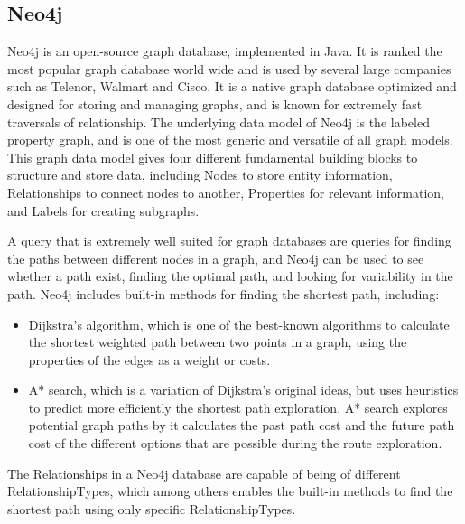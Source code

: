 \subsection{Neo4j}
\label{subsubsec:neo4j}
Neo4j\citep{website:neo4j} is an open-source graph database, implemented in Java. It is ranked the most popular graph database world wide \citep{website:graphdbranking} and is used by several large companies such as Telenor\citep{website:telenor}, Walmart\citep{website:walmart} and Cisco\citep{website:cisco}. It is a native graph database optimized and designed for storing and managing graphs, and is known for extremely fast traversals of relationship. The underlying data model of Neo4j is the labeled property graph, and is one of the most generic and versatile of all graph models\citep[p.73]{robinson13}. This graph data model gives four different fundamental building blocks to structure and store data, including Nodes to store entity information, Relationships to connect nodes to another, Properties for relevant information, and Labels for creating subgraphs.

A query that is extremely well suited for graph databases are queries for finding the paths between different nodes in a graph, and Neo4j can be used to see whether a path exist, finding the optimal path, and looking for variability in the path\citep[p. 51]{bruggen14}. Neo4j includes built-in methods for finding the shortest path, including:

\begin{itemize}
\item Dijkstra's algorithm\citep{cormen09}, which is one of the best-known algorithms to calculate the shortest weighted path between two points in a graph, using the properties of the edges as a weight or costs.
\item A* search\citep{russel10}, which is a variation of Dijkstra's original ideas, but uses heuristics to predict more efficiently the shortest path exploration. A* search explores potential graph paths by it calculates the past path cost and the future path cost of the different options that are possible during the route exploration. 
\end{itemize}

The Relationships in a Neo4j database are capable of being of different RelationshipTypes, which among others enables the built-in methods to find the shortest path using only specific RelationshipTypes. 



